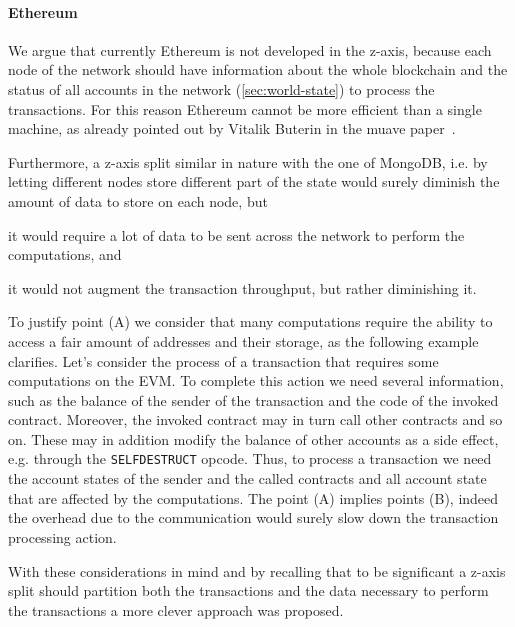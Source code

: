 \paragraph{Ethereum} We argue that currently Ethereum is not developed in the
z-axis, because each node of the network should have information about the whole
blockchain and the status of all accounts in the network
(\autoref{sec:world-state}) to process the transactions. For this reason
Ethereum cannot be more efficient than a single machine, as already pointed out
by Vitalik Buterin in the muave paper~\cite{bib:mauve}.

Furthermore, a z-axis split similar in nature with the one of MongoDB, i.e.
by letting different nodes store different part of the state would surely
diminish the amount of data to store on each node, but
\begin{enumerate*}[label=(\Alph*)]
  \item it would require a lot of data to be sent across the network to
  perform the computations, and
  \item it would not augment the transaction throughput, but rather
  diminishing it.
\end{enumerate*}
To justify point (A) we consider that many computations require the ability to
access a fair amount of addresses and their storage, as the following example
clarifies. Let's consider the process of a transaction that requires some
computations on the EVM. To complete this action we need several information,
such as the balance of the sender of the transaction and the code of the
invoked contract. Moreover, the invoked contract may in turn call other
contracts and so on. These may in addition modify the balance of other accounts
as a side effect, e.g. through the \texttt{SELFDESTRUCT} opcode. Thus, to
process a transaction we need the account states of the sender and the called
contracts and all account state that are affected by the computations.
The point (A) implies points (B), indeed the overhead due to the communication
would surely slow down the transaction processing action.

With these considerations in mind and by recalling that to be significant a
z-axis split should partition both the transactions and the data necessary to
perform the transactions a more clever approach was proposed.


